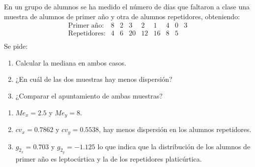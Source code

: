 {En un grupo de alumnos se ha medido el número de días que faltaron a clase una muestra de alumnos de primer año y otra de alumnos repetidores, obteniendo:
\[
\begin{array}{lcccccccc}
\mbox{Primer año:}  & 8 & 2 & 3  & 2  & 1  & 4 & 0 & 3 \\
\mbox{Repetidores:} & 4 & 6 & 20 & 12 & 16 & 8 & 5 &   \\
\end{array}
\]
Se pide:
\begin{enumerate}
\item Calcular la mediana en ambos casos.
\item ¿En cuál de las dos muestras hay menos dispersión?
\item ¿Comparar el apuntamiento de ambas muestras?
\end{enumerate}
}
{\begin{enumerate}
\item $Me_{x}=2.5$ y $Me_{y}=8$.
\item $cv_x =0.7862$ y $cv_y =0.5538$, hay menos dispersión en los alumnos repetidores.
\item $g_{2_x} =0.703$ y $g_{2_y} =-1.125$ lo que indica que la distribución de los alumnos de primer año es leptocúrtica y la de los repetidores platicúrtica.
\end{enumerate}
}
